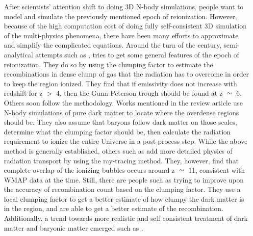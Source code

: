 After scientists' attention shift to doing 3D N-body simulations, people want to model and simulate the previously mentioned epoch of reionization.  However, because of the high computation cost of doing fully self-consistent 3D simulation of the multi-physics phenomena, there have been many efforts to approximate and simplify the complicated equations.  Around the turn of the century, semi-analytical attempts such as \citep{MadauHaardtRees1999, MiraldaEscudeHaehneltRees2000}, tries to get some general features of the epoch of reionization.  They do so by using the clumping factor to estimate the recombinations in dense clump of gas that the radiation has to overcome in order to keep the region ionized.  They find that if emissivity does not increase with redshift for z $>$ 4, then the Gunn-Peterson trough should be found at z $\simeq$ 6.  Others soon follow the methodology.  Works mentioned in the review article \citep{LoebBarkana2001} use N-body simulations of pure dark matter to locate where the overdense regions should be.   They also assume that baryons follow dark matter on those scales, determine what the clumping factor should be, then calculate the radiation requirement to ionize the entire Universe in a post-process step.  While the above method is generally established, others such as \citep{IlievEtal2006} add more detailed physics of radiation transport by using the ray-tracing method.  They, however, find that complete overlap of the ionizing bubbles occurs around z $\simeq$ 11, consistent with WMAP data at the time.  Still, there are people such as \citep{RaicevicTheuns2011} trying to improve upon the accuracy of recombination count based on the clumping factor.  They use a local clumping factor to get a better estimate of how clumpy the dark matter is in the region, and are able to get a better estimate of the recombination.  Additionally, a trend towards more realistic and self consistent treatment of dark matter and baryonic matter emerged such as \citep{ZahnEtal2007,PetkovaSpringel2011}.


